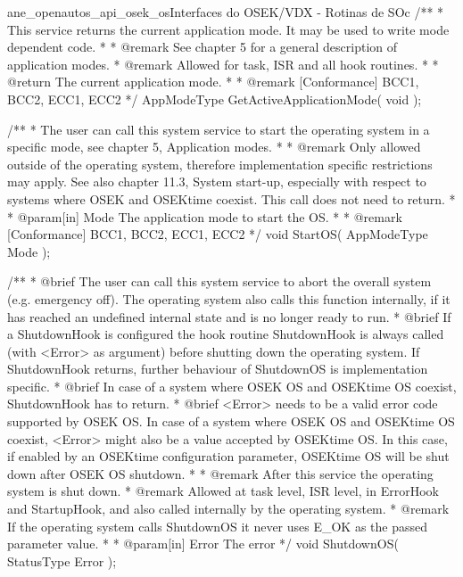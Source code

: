 \begin{algoritmo}{ane_openautos_api_osek_os}{Interfaces do OSEK/VDX - Rotinas de SO}{c}
/**
* This service returns the current application mode. It may be used to write mode dependent code.
* 
* @remark See chapter 5 for a general description of application modes.
* @remark Allowed for task, ISR and all hook routines.
*
* @return The current application mode.
* 
* @remark [Conformance] BCC1, BCC2, ECC1, ECC2
*/
AppModeType GetActiveApplicationMode( void );

/**
* The user can call this system service to start the operating system in a specific mode, see chapter 5, Application modes.
*
* @remark Only allowed outside of the operating system, therefore implementation specific restrictions may apply. See also chapter 11.3, System start-up, especially with respect to systems where OSEK and OSEKtime coexist. This call does not need to return.
*
* @param[in] Mode The application mode to start the OS.
* 
* @remark [Conformance] BCC1, BCC2, ECC1, ECC2
*/
void StartOS( AppModeType Mode );

/**
* @brief The user can call this system service to abort the overall system (e.g. emergency off). The operating system also calls this function internally, if it has reached an undefined internal state and is no longer ready to run.
* @brief If a ShutdownHook is configured the hook routine ShutdownHook is always called (with <Error> as argument) before shutting down the operating system. If ShutdownHook returns, further behaviour of ShutdownOS is implementation specific.
* @brief In case of a system where OSEK OS and OSEKtime OS coexist, ShutdownHook has to return.
* @brief <Error> needs to be a valid error code supported by OSEK OS. In case of a system where OSEK OS and OSEKtime OS coexist, <Error> might also be a value accepted by OSEKtime OS. In this case, if enabled by an OSEKtime configuration parameter, OSEKtime OS will be shut down after OSEK OS shutdown.
*
* @remark After this service the operating system is shut down.
* @remark Allowed at task level, ISR level, in ErrorHook and StartupHook, and also called internally by the operating system.
* @remark If the operating system calls ShutdownOS it never uses E_OK as the passed parameter value.
*
* @param[in]  Error  The error
*/
void ShutdownOS( StatusType Error );
\end{algoritmo}
	
